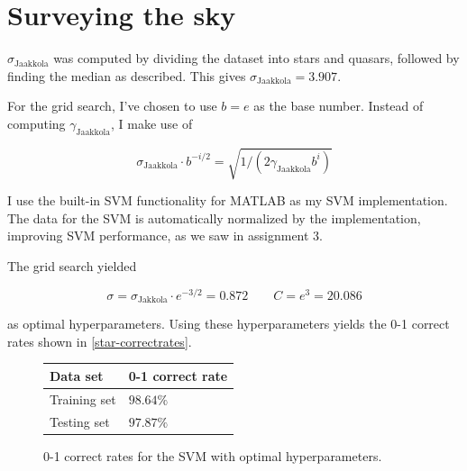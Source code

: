 \documentclass[11pt,a4paper]{article}
\begin{document}
\section{Surveying the sky}
$\sigma_{\text{Jaakkola}}$ was computed by dividing the dataset into stars
and quasars, followed by finding the median as described. This gives
$\sigma_{\text{Jaakkola}} = 3.907$.

For the grid search, I've chosen to use $b = e$ as the base number. Instead of
computing $\gamma_{\text{Jaakkola}}$, I make use of

\[
    \sigma_{\text{Jaakkola}} \cdot b^{-i/2} = \sqrt{1/(2 \gamma_{\text{Jaakkola}} b^i)}
\]

I use the built-in SVM functionality for MATLAB as my SVM implementation. The
data for the SVM is automatically normalized by the implementation, improving
SVM performance, as we saw in assignment 3.

The grid search yielded

\[ \sigma = \sigma_{\text{Jakkola}} \cdot e^{-3/2} = 0.872 \quad\quad C = e^3 = 20.086 \]

as optimal hyperparameters. Using these hyperparameters yields the 0-1 correct rates shown in
\autoref{star-correctrates}. 

\begin{figure}[h!]
    \centering
    \begin{tabular}{|l|l|}
        \hline
        Data set & 0-1 correct rate \\
        \hline
        Training set & $98.64\%$ \\
        Testing set  & $97.87\%$ \\
        \hline
    \end{tabular}
    \caption{0-1 correct rates for the SVM with optimal hyperparameters.}
    \label{star-correctrates}
\end{figure}
\end{document}
